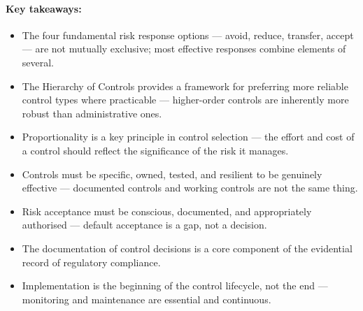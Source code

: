 \paragraph{Key takeaways:}
\begin{itemize}
  \item{The four fundamental risk response options — avoid, reduce, transfer, accept — are not mutually exclusive; most effective responses combine elements of several.}
  \item{The Hierarchy of Controls provides a framework for preferring more reliable control types where practicable — higher-order controls are inherently more robust than administrative ones.}
  \item{Proportionality is a key principle in control selection — the effort and cost of a control should reflect the significance of the risk it manages.}
  \item{Controls must be specific, owned, tested, and resilient to be genuinely effective — documented controls and working controls are not the same thing.}
  \item{Risk acceptance must be conscious, documented, and appropriately authorised — default acceptance is a gap, not a decision.}
  \item{The documentation of control decisions is a core component of the evidential record of regulatory compliance.}
  \item{Implementation is the beginning of the control lifecycle, not the end — monitoring and maintenance are essential and continuous.}
\end{itemize}

